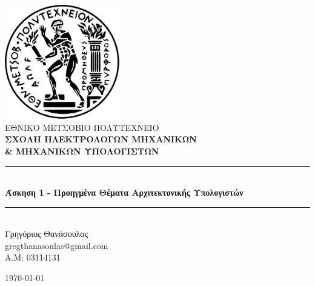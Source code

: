 \documentclass[12pt]{article}
\begin{document}
\sloppy
\begin{titlepage}



\newcommand{\HRule}{\rule{\linewidth}{0.5mm}}
\center
\includegraphics[width=50mm,scale=0.5]{image.png}\\[1cm]
\textsc{\LARGE ΕΘΝΙΚΟ ΜΕΤΣΟΒΙΟ ΠΟΛΥΤΕΧΝΕΙΟ}\\[0.05cm] %
\textsc{\textbf{\Large ΣΧΟΛΗ ΗΛΕΚΤΡΟΛΟΓΩΝ ΜΗΧΑΝΙΚΩΝ \\ \& ΜΗΧΑΝΙΚΩΝ ΥΠΟΛΟΓΙΣΤΩΝ}}\\[1.cm] %

\vspace{05mm}
\HRule \\[0.4cm]
{ \huge \bfseries Άσκηση 1 - Προηγμένα Θέματα Αρχιτεκτονικής Υπολογιστών }\\[0.4cm] 
\HRule \\[1.5cm]
 
\center
{\Large Γρηγόριος Θανάσουλας \\ \vspace{1em} gregthanasoulas@gmail.com \\ \vspace{5mm} \Large A.M: 03114131} \\
\vspace{15mm}

{\large \today} %
\vfill

\end{titlepage}
\end{document}
